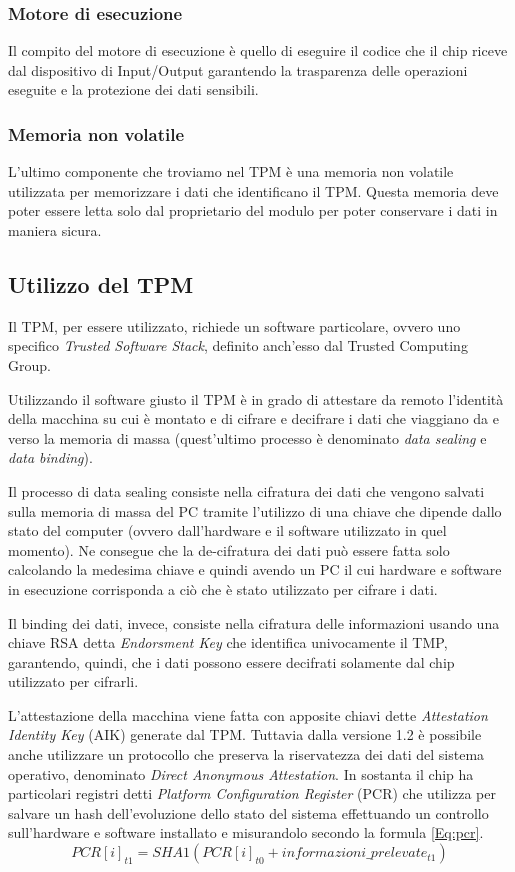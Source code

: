 \subsubsection{Motore di esecuzione}
Il compito del motore di esecuzione è quello di eseguire il codice che il chip riceve dal dispositivo di Input/Output garantendo la trasparenza delle operazioni eseguite e la protezione dei dati sensibili.

\subsubsection{Memoria non volatile}
L'ultimo componente che troviamo nel TPM è una memoria non volatile utilizzata per memorizzare i dati che identificano il TPM. Questa memoria deve poter essere letta solo dal proprietario del modulo per poter conservare i dati in maniera sicura.

\subsection{Utilizzo del TPM}
Il TPM, per essere utilizzato, richiede un software particolare, ovvero uno specifico \textit{Trusted Software Stack}, definito anch'esso dal Trusted Computing Group.

Utilizzando il software giusto il TPM è in grado di attestare da remoto l'identità della macchina su cui è montato e di cifrare e decifrare i dati che viaggiano da e verso la memoria di massa (quest'ultimo processo è denominato \textit{data sealing} e \textit{data binding}).

Il processo di data sealing consiste nella cifratura dei dati che vengono salvati sulla memoria di massa del PC tramite l'utilizzo di una chiave che dipende dallo stato del computer (ovvero dall'hardware e il software utilizzato in quel momento). Ne consegue che la de-cifratura dei dati può essere fatta solo calcolando la medesima chiave e quindi avendo un PC il cui hardware e software in esecuzione corrisponda a ciò che è stato utilizzato per cifrare i dati.

Il binding dei dati, invece, consiste nella cifratura delle informazioni usando una chiave RSA detta \textit{Endorsment Key} che identifica univocamente il TMP, garantendo, quindi, che i dati possono essere decifrati solamente dal chip utilizzato per cifrarli.

L'attestazione della macchina viene fatta con apposite chiavi dette \textit{Attestation Identity Key} (AIK) generate dal TPM. Tuttavia dalla versione 1.2 è possibile anche utilizzare un protocollo che preserva la riservatezza dei dati del sistema operativo, denominato \textit{Direct Anonymous Attestation}. In sostanta il chip ha particolari registri detti \textit{Platform Configuration Register} (PCR) che utilizza per salvare un hash dell'evoluzione dello stato del sistema effettuando un controllo sull'hardware e software installato e misurandolo secondo la formula \ref{Eq:pcr}.
    \begin{equation}
   	PCR[i]_{t1} = SHA1(PCR[i]_{t0} + informazioni\_prelevate_{t1})
    	\label{Eq:pcr}
    \end{equation}
    

